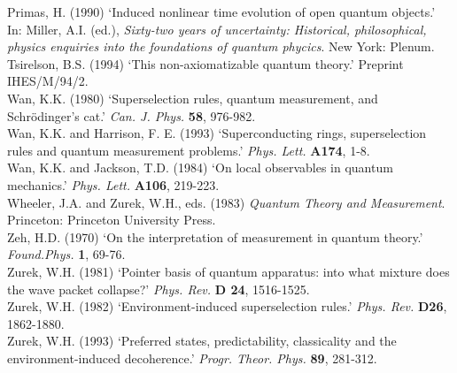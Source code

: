 \documentclass[12pt,titlepage]{article}
\begin{document}
  Primas, H. (1990) `Induced nonlinear time evolution of open quantum objects.'
In:
 Miller,  A.I. (ed.),  {\em Sixty-two
years of uncertainty: Historical, philosophical, physics enquiries into the
foundations of quantum
phycics}. New York: Plenum.\\
 Tsirelson, B.S. (1994) `This non-axiomatizable quantum theory.' Preprint
IHES/M/94/2.\\
   Wan, K.K. (1980) `Superselection rules, quantum measurement, and
Schr\"{o}dinger's cat.'
{\em  Can.
J. Phys.} {\bf 58},  976-982.\\
Wan, K.K. and  Harrison, F. E. (1993) `Superconducting rings, superselection
rules and quantum
measurement problems.' {\em Phys. Lett.} {\bf A174}, 1-8.\\
Wan, K.K. and Jackson, T.D. (1984) `On local observables in quantum mechanics.'
 {\em Phys. Lett.} {\bf A106}, 219-223.\\
 Wheeler, J.A.  and  Zurek, W.H., eds. (1983) {\em Quantum Theory and
Measurement}.  Princeton:  Princeton University Press.\\
  Zeh, H.D. (1970) `On the interpretation of measurement in quantum theory.'
  {\em Found.Phys.} {\bf 1},  69-76.\\
 Zurek, W.H. (1981) `Pointer basis of quantum apparatus: into what mixture does
the wave
packet collapse?'   {\em  Phys. Rev.} {\bf D 24},  1516-1525.\\
  Zurek, W.H. (1982)  `Environment-induced superselection rules.'
 {\em Phys. Rev.} {\bf D26},  1862-1880.\\
  Zurek, W.H. (1993) `Preferred states, predictability, classicality and the
environment-induced decoherence.' {\em  Progr. Theor. Phys.} {\bf 89}, 281-312.
 
\end{document}
